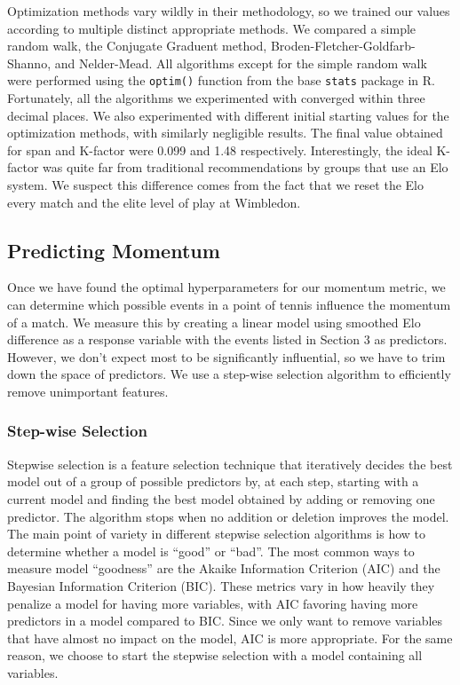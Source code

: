 \documentclass[letterpaper, 12pt]{article}
\begin{document}
            Optimization methods vary wildly in their methodology, so we trained our values according to multiple distinct appropriate methods. We compared a simple random walk, the Conjugate Graduent method, Broden-Fletcher-Goldfarb-Shanno, and Nelder-Mead. All algorithms except for the simple random walk were performed using the \texttt{optim()} function from the base \texttt{stats} package in R. Fortunately, all the algorithms we experimented with converged within three decimal places. We also experimented with different initial starting values for the optimization methods, with similarly negligible results. The final value obtained for span and K-factor were 0.099 and 1.48 respectively. Interestingly, the ideal K-factor was quite far from traditional recommendations by groups that use an Elo system. We suspect this difference comes from the fact that we reset the Elo every match and the elite level of play at Wimbledon.
            
        \subsection{Predicting Momentum}
        
        Once we have found the optimal hyperparameters for our momentum metric, we can determine which possible events in a point of tennis influence the momentum of a match. We measure this by creating a linear model using smoothed Elo difference as a response variable with the events listed in Section 3 as predictors. However, we don't expect most to be significantly influential, so we have to trim down the space of predictors. We use a step-wise selection algorithm to efficiently remove unimportant features.

        \subsubsection{Step-wise Selection}

        Stepwise selection is a feature selection technique that iteratively decides the best model out of a group of possible predictors by, at each step, starting with a current model and finding the best model obtained by adding or removing one predictor. The algorithm stops when no addition or deletion improves the model. The main point of variety in different stepwise selection algorithms is how to determine whether a model is ``good'' or ``bad''. The most common ways to measure model ``goodness'' are the Akaike Information Criterion (AIC) and the Bayesian Information Criterion (BIC). These metrics vary in how heavily they penalize a model for having more variables, with AIC favoring having more predictors in a model compared to BIC. Since we only want to remove variables that have almost no impact on the model, AIC is more appropriate. For the same reason, we choose to start the stepwise selection with a model containing all variables. 
        
\end{document}
